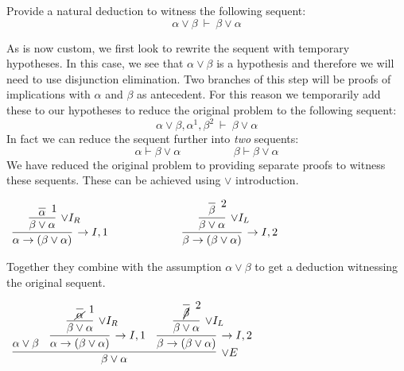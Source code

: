 \documentclass{book}
\begin{document}
    \begin{eg}

        Provide a natural deduction to witness the following sequent: $$\alpha \lor \beta \ \vdash \ \beta \lor \alpha $$

        As is now custom, we first look to rewrite the sequent with temporary hypotheses. In this case, we see that $\alpha \lor \beta$ is a hypothesis and therefore we will need to use disjunction elimination. Two branches of this step will be proofs of implications with $\alpha$ and $\beta$ as antecedent. For this reason we temporarily add these to our hypotheses to reduce the original problem to the following sequent: $$\alpha \lor \beta, \alpha^{1}, \beta^{2} \ \vdash \ \beta \lor \alpha $$
        In fact we can reduce the sequent further into \emph{two} sequents: $$\alpha \vdash \beta \lor \alpha \hspace{2cm} \beta \vdash \beta \lor \alpha$$
        We have reduced the original problem to providing separate proofs to witness these sequents. These can be achieved using $\lor$ introduction. 

        \begin{center}
            $\begin{array}{c c}
                \infer[\to I,1]{\alpha \to (\beta \lor \alpha)}
                        {\infer[\lor I_{R}]{\beta \lor \alpha}
                            {\infer[1]{\alpha}
                                {}}}

                    \hspace{1cm}
                &
                    \hspace{1cm}

                \infer[\to I,2]{\beta \to (\beta \lor \alpha)}
                        {\infer[\lor I_{L}]{\beta \lor \alpha}
                            {\infer[2]{\beta}
                                {}}}
            \end{array}$
        \end{center}

        Together they combine with the assumption $\alpha \lor \beta$ to get a deduction witnessing the original sequent. 

        \begin{center}
            $\begin{array}{c}
                \infer[\lor E]{\beta \lor \alpha}
                    {\alpha \lor \beta
                    &
                    \infer[\to I,1]{\alpha \to (\beta \lor \alpha)}
                        {\infer[\lor I_{R}]{\beta \lor \alpha}
                            {\infer[1]{\cancel{\alpha}}
                                {}}}
                    &
                    \infer[\to I,2]{\beta \to (\beta \lor \alpha)}
                        {\infer[\lor I_{L}]{\beta \lor \alpha}
                            {\infer[2]{\cancel{\beta}}
                                {}}}}
            \end{array}$
        \end{center}

        
    \end{eg}
\end{document}
